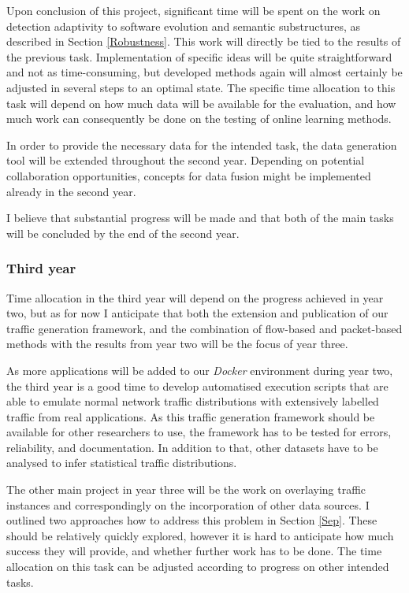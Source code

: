 \documentclass[a4paper,12pt,twoside]{report}
\begin{document}
Upon conclusion of this project, significant time will be spent on the work on detection adaptivity to software evolution and semantic substructures, as described in Section \ref{Robustness}. This work will directly be tied to the results of the previous task. Implementation of specific ideas will be quite straightforward and not as time-consuming, but developed methods again will almost certainly be adjusted in several steps to an optimal state. The specific time allocation to this task will depend on how much data will be available for the evaluation, and how much work can consequently be done on the testing of online learning methods. 

In order to provide the necessary data for the intended task, the data generation tool will be extended throughout the second year. Depending on potential collaboration opportunities, concepts for data fusion might be implemented already in the second year.

I believe that substantial progress will be made and that both of the main tasks will be concluded by the end of the second year.

\subsubsection{Third year}

Time allocation in the third year will depend on the progress achieved in year two, but as for now I anticipate that both the extension and publication of our traffic generation framework, and the combination of flow-based and packet-based methods with the results from year two will be the focus of year three. 

As more applications will be added to our \textit{Docker} environment during year two, the third year is a good time to develop automatised execution scripts that are able to emulate normal network traffic distributions with extensively labelled traffic from real applications. As this traffic generation framework should be available for other researchers to use, the framework has to be tested for errors, reliability, and documentation. In addition to that, other datasets have to be analysed to infer statistical traffic distributions. 

The other main project in year three will be the work on overlaying traffic instances and correspondingly on the incorporation of other data sources. I outlined two approaches how to address this problem in Section \ref{Sep}. These should be relatively quickly explored, however it is hard to anticipate how much success they will provide, and whether further work has to be done. The time allocation on this task can be adjusted according to progress on other intended tasks.
\end{document}
